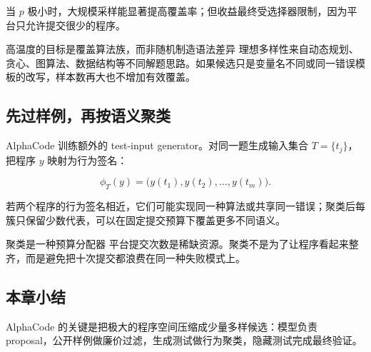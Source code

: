 当 $p$ 极小时，大规模采样能显著提高覆盖率；但收益最终受选择器限制，因为平台只允许提交很少的程序。

\begin{importantbox}{高温度的目标是覆盖算法族，而非随机制造语法差异}
理想多样性来自动态规划、贪心、图算法、数据结构等不同解题思路。如果候选只是变量名不同或同一错误模板的改写，样本数再大也不增加有效覆盖。
\end{importantbox}

\subsection{先过样例，再按语义聚类}


AlphaCode 训练额外的 test-input generator。对同一题生成输入集合 $T=\{t_j\}$，把程序 $y$ 映射为行为签名：

$$
\phi_T(y)=\bigl(y(t_1),y(t_2),\ldots,y(t_m)\bigr).
$$

若两个程序的行为签名相近，它们可能实现同一种算法或共享同一错误；聚类后每簇只保留少数代表，可以在固定提交预算下覆盖更多不同语义。

\begin{knowledgebox}{聚类是一种预算分配器}
平台提交次数是稀缺资源。聚类不是为了让程序看起来整齐，而是避免把十次提交都浪费在同一种失败模式上。
\end{knowledgebox}

\subsection{本章小结}

AlphaCode 的关键是把极大的程序空间压缩成少量多样候选：模型负责 proposal，公开样例做廉价过滤，生成测试做行为聚类，隐藏测试完成最终验证。

